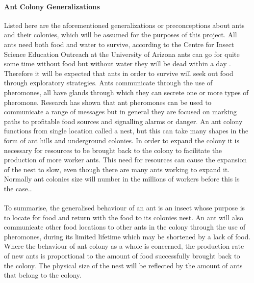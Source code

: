 \documentclass[main.tex]{subfiles}
\begin{document}
\paragraph{Ant Colony Generalizations}
Listed here are the aforementioned generalizations or preconceptions about ants and their colonies, which will be assumed for the purposes of this project. All ants need both food and water to survive, according to the Centre for Insect Science Education Outreach at the University of Arizona ants can go for quite some time without food but without water they will be dead within a day \cite{Insect1997}. Therefore it will be expected that ants in order to survive will seek out food through exploratory strategies. Ants communicate through the use of pheromones, all have glands through which they can secrete one or more types of pheromone\cite{Jackson2006}. Research has shown that ant pheromones can be used to communicate a range of messages but in general they are focused on marking paths to profitable food sources and signalling alarms or danger. An ant colony functions from single location called a nest, but this can take many shapes in the form of ant hills and underground colonies. In order to expand the colony it is necessary for resources to be brought back to the colony to facilitate the production of more worker ants. This need for resources can cause the expansion of the nest to slow, even though there are many ants working to expand it. Normally ant colonies size will number in the millions of workers before this is the case.\cite{Senthilingam2012}.

\paragraph{}To summarise, the generalised behaviour of an ant is an insect whose purpose is to locate for food and return with the food to its colonies nest. An ant will also communicate other food locations to other ants in the colony through the use of pheromones, during its limited lifetime which may be shortened by a lack of food. Where the behaviour of ant colony as a whole is concerned, the production rate of new ants is proportional to the amount of food successfully brought back to the colony. The physical size of the nest will be reflected by the amount of ants that belong to the colony.

\end{document}
